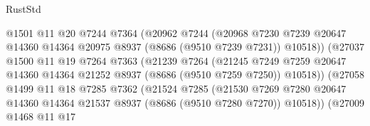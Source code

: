 \begin{lexlean}{RustStd}
\begin{coremodule}
                                  @1501
                                  @11
                                  @20
                                  @7244
                                  @7364
                                  (@20962
                                    @7244
                                    (@20968
                                      @7230
                                      @7239
                                      @20647
                                      @14360
                                      @14364
                                      @20975
                                      @8937
                                      (@8686 (@9510 @7239 @7231))
                                      @10518))
                                  (@27037
                                    @1500
                                    @11
                                    @19
                                    @7264
                                    @7363
                                    (@21239
                                      @7264
                                      (@21245
                                        @7249
                                        @7259
                                        @20647
                                        @14360
                                        @14364
                                        @21252
                                        @8937
                                        (@8686 (@9510 @7259 @7250))
                                        @10518))
                                    (@27058
                                      @1499
                                      @11
                                      @18
                                      @7285
                                      @7362
                                      (@21524
                                        @7285
                                        (@21530
                                          @7269
                                          @7280
                                          @20647
                                          @14360
                                          @14364
                                          @21537
                                          @8937
                                          (@8686 (@9510 @7280 @7270))
                                          @10518))
                                      (@27009
                                        @1468
                                        @11
                                        @17

\end{coremodule}
\end{lexlean}
